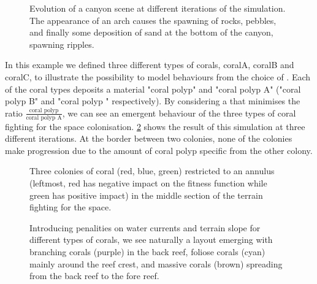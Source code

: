 \begin{figure}
    \caption{Evolution of a canyon scene at different iterations of the simulation. The appearance of an arch causes the spawning of rocks, pebbles, and finally some deposition of sand at the bottom of the canyon, spawning ripples.}
    \label{fig:env-obj-canyon-scene}
\end{figure}

In this example we defined three different types of corals, coralA, coralB and coralC, to illustrate the possibility to model behaviours from the choice of . Each of the coral types deposits a material "coral polyp" and "coral polyp A" ("coral polyp B" and "coral polyp \curve" respectively). By considering a  that minimises the ratio $\frac{\text{coral polyp}}{\text{coral polyp A}}$, we can see an emergent behaviour of the three types of coral fighting for the space colonisation.
\cref{fig:env-obj-coral-colonization-scene} shows the result of this simulation at three different iterations. At the border between two colonies, none of the colonies make progression due to the amount of coral polyp specific from the other colony.

\begin{figure}
    \caption{Three colonies of coral (red, blue, green) restricted to an annulus (leftmost, red has negative impact on the fitness function while green has positive impact) in the middle section of the terrain fighting for the space.}
    \label{fig:env-obj-coral-colonization-scene}
\end{figure}

\begin{figure}
    \caption{Introducing penalities on water currents and terrain slope for different types of corals, we see naturally a layout emerging with branching corals (purple) in the back reef, foliose corals (cyan) mainly around the reef crest, and massive corals (brown) spreading from the back reef to the fore reef. }
    \label{fig:env-obj-coral-layout}
\end{figure}


